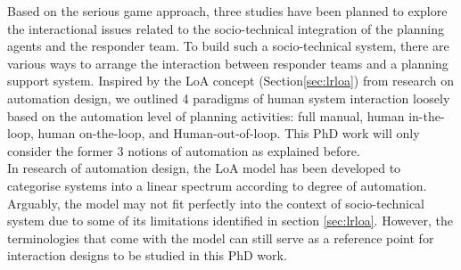 Based on the serious game approach, three studies have been planned to explore the interactional issues related to the socio-technical integration of the planning agents and the responder team. To build such a socio-technical system, there are various ways to arrange the interaction between responder teams and a planning support system. Inspired by the \acf{LoA} concept (Section\ref{sec:lrloa}) from research on automation design, we outlined 4 paradigms of human system interaction loosely based on the automation level of planning activities: full manual, human in-the-loop, human on-the-loop, and Human-out-of-loop. This PhD work will only consider the former 3 notions of automation as explained before.\\

In research of automation design, the \ac{LoA} model has been developed to categorise systems into a linear spectrum according to degree of automation. Arguably, the model may not fit perfectly into the context of socio-technical system due to some of its limitations identified in section \ref{sec:lrloa}. However, the terminologies that come with the model can still serve as a reference point for interaction designs to be studied in this PhD work.


